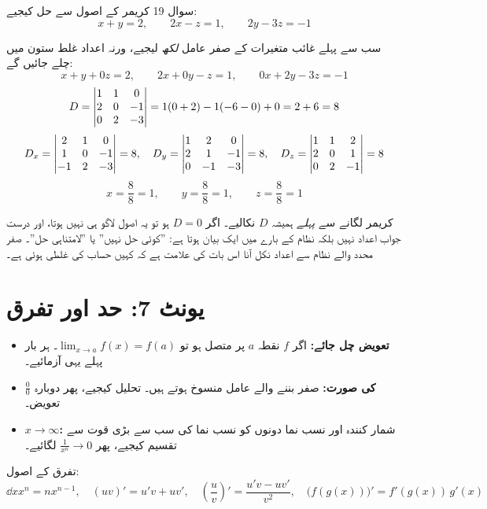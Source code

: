 \begin{sawal}{سوال \textenglish{19}}
کریمر کے اصول سے حل کیجیے:
\[
x+y=2,\qquad 2x-z=1,\qquad 2y-3z=-1
\]
\end{sawal}

\begin{hal}
سب سے پہلے غائب متغیرات کے صفر عامل \emph{لکھ} لیجیے، ورنہ اعداد غلط ستون میں
چلے جائیں گے:
\[
x+y+0z=2,\qquad 2x+0y-z=1,\qquad 0x+2y-3z=-1
\]
\[
D=\begin{vmatrix}1&1&0\\2&0&-1\\0&2&-3\end{vmatrix}=1(0+2)-1(-6-0)+0=2+6=8
\]
\[
D_x=\begin{vmatrix}2&1&0\\1&0&-1\\-1&2&-3\end{vmatrix}=8,\quad
D_y=\begin{vmatrix}1&2&0\\2&1&-1\\0&-1&-3\end{vmatrix}=8,\quad
D_z=\begin{vmatrix}1&1&2\\2&0&1\\0&2&-1\end{vmatrix}=8
\]
\[
x=\frac88=1,\qquad y=\frac88=1,\qquad z=\frac88=1
\]

\end{hal}

\begin{ghalti}
کریمر لگانے سے \emph{پہلے} ہمیشہ \(D\) نکالیے۔ اگر \(D=0\) ہو تو یہ اصول لاگو
ہی نہیں ہوتا، اور درست جواب اعداد نہیں بلکہ نظام کے بارے میں ایک بیان ہوتا ہے:
''کوئی حل نہیں'' یا ''لامتناہی حل''۔ صفر محدد والے نظام سے اعداد نکل آنا اس بات
کی علامت ہے کہ کہیں حساب کی غلطی ہوئی ہے۔
\end{ghalti}

\section*{یونٹ \textenglish{7}: حد اور تفرق}

\begin{nukta}
\begin{itemize}
  \item \textbf{تعویض چل جائے:} اگر \(f\) نقطہ \(a\) پر متصل ہو تو
        \(\lim_{x\to a}f(x)=f(a)\)۔ ہر بار پہلے یہی آزمائیے۔
  \item \textbf{\(\tfrac00\) کی صورت:} صفر بننے والے عامل منسوخ ہوتے ہیں۔
        تحلیل کیجیے، پھر دوبارہ تعویض۔
  \item \textbf{\(x\to\infty\):} شمار کنندہ اور نسب نما دونوں کو نسب نما کی سب
        سے بڑی قوت سے تقسیم کیجیے، پھر \(\tfrac{1}{x^{n}}\to 0\) لگائیے۔
\end{itemize}
تفرق کے اصول:
\[
\dd{}{x}x^{n}=nx^{n-1},\quad
(uv)'=u'v+uv',\quad
\left(\frac uv\right)'=\frac{u'v-uv'}{v^{2}},\quad
\bigl(f(g(x))\bigr)'=f'(g(x))\,g'(x)
\]
\end{nukta}


